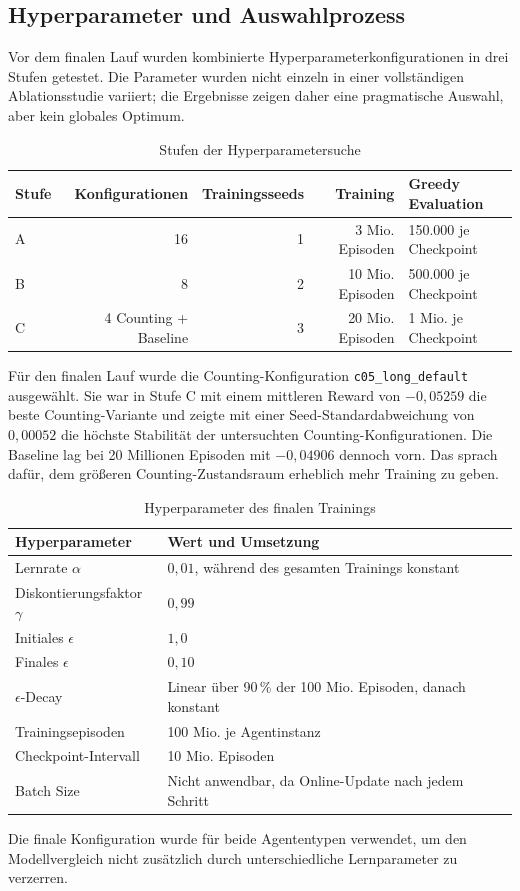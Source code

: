 \subsection{Hyperparameter und Auswahlprozess}

Vor dem finalen Lauf wurden kombinierte Hyperparameterkonfigurationen
in drei Stufen getestet. Die Parameter wurden nicht einzeln in einer
vollständigen Ablationsstudie variiert; die Ergebnisse zeigen daher
eine pragmatische Auswahl, aber kein globales Optimum.

\begin{table}[H]
  \centering
  \caption{Stufen der Hyperparametersuche}
  \label{tab:tuning_stages}
  \small
  \begin{tabularx}{\textwidth}{lrrrX}
    \toprule
    \textbf{Stufe} & \textbf{Konfigurationen} &
    \textbf{Trainingsseeds} & \textbf{Training} & \textbf{Greedy Evaluation}\\
    \midrule
    A & 16 & 1 & 3 Mio. Episoden & 150.000 je Checkpoint\\
    B & 8  & 2 & 10 Mio. Episoden & 500.000 je Checkpoint\\
    C & 4 Counting + Baseline & 3 & 20 Mio. Episoden & 1 Mio. je Checkpoint\\
    \bottomrule
  \end{tabularx}
\end{table}

Für den finalen Lauf wurde die Counting-Konfiguration
\texttt{c05\_long\_default} ausgewählt. Sie war in Stufe C mit einem
mittleren Reward von $-0{,}05259$ die beste Counting-Variante und
zeigte mit einer Seed-Standardabweichung von $0{,}00052$ die höchste
Stabilität der untersuchten Counting-Konfigurationen. Die Baseline
lag bei 20 Millionen Episoden mit $-0{,}04906$ dennoch vorn. Das
sprach dafür, dem größeren Counting-Zustandsraum erheblich mehr
Training zu geben.

\begin{table}[H]
  \centering
  \caption{Hyperparameter des finalen Trainings}
  \label{tab:hyperparameters}
  \begin{tabularx}{\textwidth}{lX}
    \toprule
    \textbf{Hyperparameter} & \textbf{Wert und Umsetzung}\\
    \midrule
    Lernrate $\alpha$ & $0{,}01$, während des gesamten Trainings konstant\\
    Diskontierungsfaktor $\gamma$ & $0{,}99$\\
    Initiales $\epsilon$ & $1{,}0$\\
    Finales $\epsilon$ & $0{,}10$\\
    $\epsilon$-Decay & Linear über 90\,\% der 100 Mio. Episoden,
    danach konstant\\
    Trainingsepisoden & 100 Mio. je Agentinstanz\\
    Checkpoint-Intervall & 10 Mio. Episoden\\
    Batch Size & Nicht anwendbar, da Online-Update nach jedem Schritt\\
    \bottomrule
  \end{tabularx}
\end{table}

Die finale Konfiguration wurde für beide Agententypen verwendet, um
den Modellvergleich nicht zusätzlich durch unterschiedliche
Lernparameter zu verzerren.
